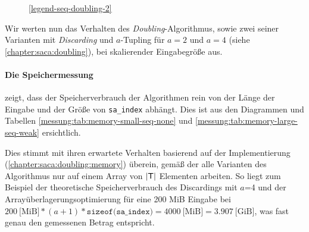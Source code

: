 \begin{figure}[ht]

    \medskip
    \ref{legend-seq-doubling-2}
\end{figure}
\FloatBarrier

Wir werten nun das Verhalten des \textit{Doubling}-Algorithmus, sowie zwei seiner Varianten mit \textit{Discarding} und $a$-Tupling für $a=2$ und $a=4$ (siehe \cref{chapter:saca:doubling}), bei skalierender Eingabegröße aus.

\paragraph{Die Speichermessung} zeigt, dass der Speicherverbrauch der Algorithmen rein von der Länge der Eingabe und der Größe von \texttt{sa\_index} abhängt. Dies ist aus den Diagrammen und Tabellen \ref{messung:tab:memory-small-seq-none} und \ref{messung:tab:memory-large-seq-weak} ersichtlich.

Dies stimmt mit ihren erwartete Verhalten basierend auf der Implementierung (\cref{chapter:saca:doubling:memory}) überein, gemäß der alle Varianten des Algorithmus nur auf einem Array von $|\inputtext|$ Elementen arbeiten. So liegt zum Beispiel der theoretische Speicherverbrauch des Discardings mit $a$=4 und der Arrayüberlagerungsoptimierung für eine 200 MiB Eingabe bei $200~\text{[MiB]} * (a+1) * \texttt{sizeof(sa\_index)} = 4000~\text{[MiB]} = 3.907~\text{[GiB]}$, was fast genau den gemessenen Betrag entspricht.

